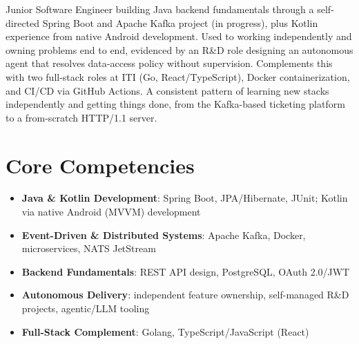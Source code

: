 \documentclass[11pt,a4paper,sans]{moderncv}
\begin{document}
\makecvtitle


\vspace{6pt}
\small{Junior Software Engineer building Java backend fundamentals through a self-directed Spring Boot and Apache Kafka project (in progress), plus Kotlin experience from native Android development. Used to working independently and owning problems end to end, evidenced by an R\&D role designing an autonomous agent that resolves data-access policy without supervision. Complements this with two full-stack roles at ITI (Go, React/TypeScript), Docker containerization, and CI/CD via GitHub Actions. A consistent pattern of learning new stacks independently and getting things done, from the Kafka-based ticketing platform to a from-scratch HTTP/1.1 server.}


\section{Core Competencies}
\vspace{1pt}
\begin{itemize}

\item \textbf{Java \& Kotlin Development}: Spring Boot, JPA/Hibernate, JUnit; Kotlin via native Android (MVVM) development

\item \textbf{Event-Driven \& Distributed Systems}: Apache Kafka, Docker, microservices, NATS JetStream

\item \textbf{Backend Fundamentals}: REST API design, PostgreSQL, OAuth 2.0/JWT

\item \textbf{Autonomous Delivery}: independent feature ownership, self-managed R\&D projects, agentic/LLM tooling

\item \textbf{Full-Stack Complement}: Golang, TypeScript/JavaScript (React)

\end{itemize}

\end{document}
